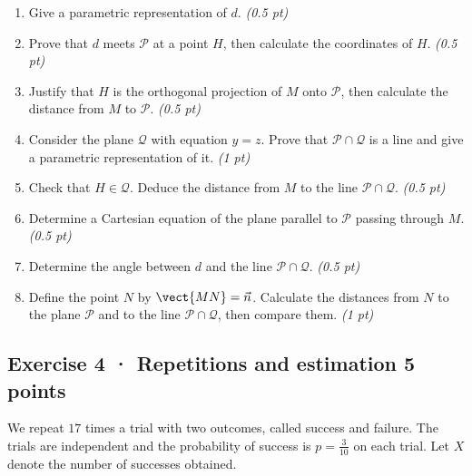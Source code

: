 \begin{enumerate}

\item Give a parametric representation of $d$. \hfill\textit{(0.5 pt)}

\item Prove that $d$ meets $\mathcal P$ at a point $H$, then calculate the coordinates of $H$. \hfill\textit{(0.5 pt)}

\item Justify that $H$ is the orthogonal projection of $M$ onto $\mathcal P$, then calculate the distance from $M$ to $\mathcal P$. \hfill\textit{(0.5 pt)}

\item Consider the plane $\mathcal Q$ with equation $y=z$. Prove that $\mathcal P\cap\mathcal Q$ is a line and give a parametric representation of it. \hfill\textit{(1 pt)}

\item Check that $H\in\mathcal Q$. Deduce the distance from $M$ to the line $\mathcal P\cap\mathcal Q$. \hfill\textit{(0.5 pt)}

\item Determine a Cartesian equation of the plane parallel to $\mathcal P$ passing through $M$. \hfill\textit{(0.5 pt)}

\item Determine the angle between $d$ and the line $\mathcal P\cap\mathcal Q$. \hfill\textit{(0.5 pt)}

\item Define the point $N$ by $\vect{MN}=\vec n$. Calculate the distances from $N$ to the plane $\mathcal P$ and to the line $\mathcal P\cap\mathcal Q$, then compare them. \hfill\textit{(1 pt)}

\end{enumerate}

\subsection*{Exercise 4 · Repetitions and estimation \hfill 5 points}We repeat $17$ times a trial with two outcomes, called success and failure. The trials are independent and the probability of success is $p=\frac{3}{10}$ on each trial. Let $X$ denote the number of successes obtained.

